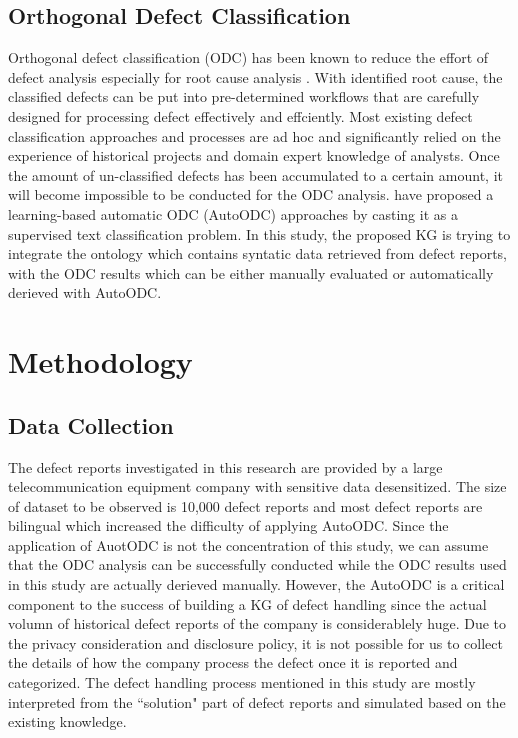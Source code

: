 \documentclass[12pt] {article}
\begin{document}
\subsection{Orthogonal Defect Classification}
Orthogonal defect classification (ODC) has been known to reduce the effort of defect analysis especially for root cause analysis \cite{buglione2006introducing}.
With identified root cause, the classified defects can be put into pre-determined workflows that are carefully designed for processing defect effectively and effciently. 
Most existing defect classification approaches and processes are ad hoc and significantly relied on the experience of historical projects and domain expert knowledge of analysts. 
Once the amount of un-classified defects has been accumulated to a certain amount, it will become impossible to be conducted for the ODC analysis.
 have proposed a learning-based automatic ODC (AutoODC) approaches by casting it as a supervised text classification problem.
In this study, the proposed KG is trying to integrate the ontology which contains syntatic data retrieved from defect reports, with the ODC results which can be either manually evaluated or automatically derieved with AutoODC.  

\section{Methodology}
\subsection{Data Collection}
The defect reports investigated in this research are provided by a large telecommunication equipment company with sensitive data desensitized.
The size of dataset to be observed is 10,000 defect reports and most defect reports are bilingual which increased the difficulty of applying AutoODC.
Since the application of AuotODC is not the concentration of this study, we can assume that the ODC analysis can be successfully conducted while the ODC results used in this study are actually derieved manually.
However, the AutoODC is a critical component to the success of building a KG of defect handling since the actual volumn of historical defect reports of the company is considerablely huge.
Due to the privacy consideration and disclosure policy, it is not possible for us to collect the details of how the company process the defect once it is reported and categorized.
The defect handling process mentioned in this study are mostly interpreted from the ``solution" part of defect reports and simulated based on the existing knowledge.
\end{document}

